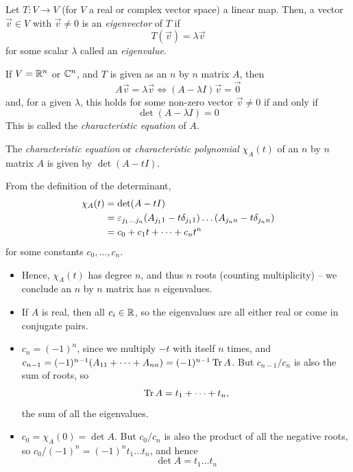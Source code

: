 \documentclass{../template/note}
\begin{document}
    \begin{definition}
        Let \(T: V \to V\) (for \(V\) a real or complex vector space) a linear map. Then, a vector \(\vec v \in V\) with \(\vec v \neq 0\) is an \emph{eigenvector} of \(T\) if
        \[
            T(\vec v) = \lambda \vec v
        \]
        for some scalar \(\lambda\) called an \emph{eigenvalue}.
    \end{definition}
    
    If \(V = \mathbb R^n\) or \(\mathbb C^n\), and \(T\) is given as an \(n\) by \(n\) matrix \(A\), then
    \[
        A\vec v = \lambda \vec v \iff (A - \lambda I) \vec v = \vec 0
    \]
    and, for a given \(\lambda\), this holds for some non-zero vector \(\vec v \neq 0\) if and only if
    \[
        \det(A - \lambda I) = 0
    \]
    This is called the \emph{characteristic equation} of \(A\).

    \begin{definition}
        The \emph{characteristic equation} or \emph{characteristic polynomial} \(\chi_A(t)\) of an \(n\) by \(n\) matrix \(A\) is given by \(\det(A - tI)\).
    \end{definition}
    
    
    \begin{remark*}
        From the definition of the determinant,
        \begin{align*}
            \chi_A(t) &= \det(A - t I) \\
            &= \varepsilon_{j_1\dots j_n}(A_{j_11}-t\delta_{j_11})\dots(A_{j_nn}-t\delta_{j_nn}) \\
            &= c_0 + c_1t + \dots + c_nt^n
        \end{align*}
        for some constants \(c_0, \dots, c_n\).
        \begin{itemize}
            \item Hence, \(\chi_A(t)\) has degree \(n\), and thus \(n\) roots (counting multiplicity) -- we conclude an \(n\) by \(n\) matrix has \(n\) eigenvalues.
            \item If \(A\) is real, then all \(c_i \in \mathbb R\), so the eigenvalues are all either real or come in conjugate pairs.
            \item \(c_n = (-1)^n\), since we multiply \(-t\) with itself \(n\) times, and \(c_{n-1} = (-1)^{n-1}(A_{11} + \dots + A_{nn}) = (-1)^{n-1} \operatorname{Tr} A\). But \(c_{n-1}/c_n\) is also the sum of roots, so
            \[
                \operatorname{Tr} A = t_1 + \dots + t_n,
            \]
            the sum of all the eigenvalues.
            \item \(c_0 = \chi_A(0) = \det A\). But \(c_0/c_n\) is also the product of all the negative roots, so \(c_0/(-1)^n = (-1)^n t_1 \dots t_n\), and hence
            \[
                \det A = t_1 \dots t_n
            \]
        \end{itemize}
    \end{remark*}
    
\end{document}
